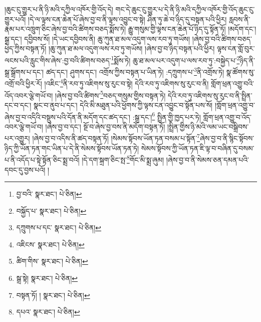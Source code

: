 །ཆུང་ངུ་གྱུར་པ་ནི་ཉི་མའི་དཀྱིལ་འཁོར་གྱི་འོད་དེ། གང་དེ་ཆུང་ངུ་གྱུར་པ་དེ་ནི་ཉི་མའི་དཀྱིལ་འཁོར་གྱི་འོད་ཆུང་ངུ་གྱུར་པའོ། །དེ་ལ་ལྟས་ངན་ཆེན་པོ་ཞེས་བྱ་བ་ནི་ལྟས་འབྱུང་བ་སྟེ། ཤིན་ཏུ་ཆེ་བ་ཉིད་དུ་བསྟན་པའི་ཕྱིར། རླབས་ནི་རྣམ་པར་འཁྲུག་ཅིང་ཞེས་བྱ་བའི་ཚིགས་བཅད་སྨོས་ཏེ། རྒྱུ་གསུམ་གྱི་ལྟས་ངན་ཆེན་པོ་ཉིད་དུ་སྟོན་ཏོ། །མདོག་དང་། སྒྲ་དང་། དབྱིབས་སོ། །དེ་ཡང་དབྱིབས་ནི། ཆུ་ཀུན་ཐ་མལ་འདུག་ལས་རབ་ཏུ་གཡོས། །ཞེས་བྱ་བའི་ཚིགས་བཅད་ཕྱེད་ཀྱིས་བསྟན་ཏོ། །ཆུ་ཀུན་ཐ་མལ་འདུག་ལས་རབ་ཏུ་གཡོས། །ཞེས་བྱ་བ་ཉིད་བསྟན་པའི་ཕྱིར། ལྟས་ངན་གློ་བུར་ལངས་པའི་རླུང་གིས་ཞེས་:བྱ་བའི་ཚིགས་བཅད་\footnote{བྱ་བའི་  སྣར་ཐང་།  པེ་ཅིན། }སྨོས་ཏེ། ཆུ་ཐ་མལ་པར་འདུག་པ་ལས་རབ་ཏུ་:བསྐྱེད་པ་\footnote{བསྐྱོད་པ་  སྣར་ཐང་།  པེ་ཅིན། }ཉིད་ནི་སྒྲ་སྒྲོགས་པ་དང་། ཚད་དང་། ཤུགས་དང་། འགྲོས་ཀྱིས་བསྟན་པ་ཡིན་ཏེ། :དཀྲུགས་པ་\footnote{དཀྲུགས་པ་དང་  སྣར་ཐང་།  པེ་ཅིན། }ནི་འགྲོས་ཏེ། སྣ་ཚོགས་སུ་འགྲོ་བའི་ཕྱིར་རོ། །འཇིང་\footnote{འཇིངས་  སྣར་ཐང་།  པེ་ཅིན། }ནི་རབ་ཏུ་འཇིགས་སུ་རུང་བ་སྟེ། དེའི་རབ་ཏུ་འཇིགས་སུ་རུང་བ་ནི། གློག་ཕྲན་འགྱུ་བའི་འོད་འབར་ལྕེ་གཡོ་བ། །ཞེས་བྱ་བའི་ཚིགས་\footnote{ཚིག་གིས་  སྣར་ཐང་།  པེ་ཅིན། }བཅད་གསུམ་གྱིས་བསྟན་ཏེ། དེའི་རབ་ཏུ་འཇིགས་སུ་རུང་བ་ནི་སྤྲིན་དང་བ་དང་། སྣང་བ་ནུབ་པ་དང་། དེའི་མི་མཐུན་པའི་ཕྱོགས་ཀྱི་ལྟས་ངན་འབྱུང་བ་སྟོན་པས་སོ། །གློག་ཕྲན་འགྱུ་བ་ཞེས་བྱ་བ་འདིའི་བསྡུས་པའི་དོན་ནི་མདོག་དང་ཚད་དང་། :སྒྲ་དང་།\footnote{སྒྲ་སྟེ།  སྣར་ཐང་།  པེ་ཅིན། } སྤྲིན་གྱི་ཁྱད་པར་ཏེ། གློག་ཕྲན་འགྱུ་བ་འོད་འབར་ལྕེ་གཡོ་བ། །ཞེས་བྱ་བ་དང་། སྔོ་བ་ཞེས་བྱ་བས་ནི་མདོག་བསྟན་ཏོ། །སྤྲིན་གྱིས་ཉི་མའི་ལམ་ཡང་བསྒྲིབས་པར་འགྱུར། །ཞེས་བྱ་བ་འདིས་ནི་ཚད་བསྟན་ཏོ། །སེམས་སྟོབས་ཡོན་ཏན་བསམ་པ་སྟོན་\footnote{བསྟན་ཏོ། །  སྣར་ཐང་།  པེ་ཅིན། }ཞེས་བྱ་བ་ནི་སྙིང་སྟོབས་ཉིད་ཀྱི་ཡོན་ཏན་གང་ཡིན་པ་དེ་ནི་སེམས་སྟོབས་ཡོན་ཏན་ཏེ། སེམས་སྟོབས་ཀྱི་ཡོན་ཏན་ཇི་ལྟ་བ་བཞིན་དུ་བསམ་པ་ནི་འདོད་པ་སྟེ་སྟོན་ཅིང་སྨྲ་བའོ། །དེ་དག་སྐྲག་ཅིང་སྤ་\footnote{དཔའ་  སྣར་ཐང་།  པེ་ཅིན། }གོང་མི་སྨྲ་ཞུམ། །ཞེས་བྱ་བ་ནི་སེམས་ཅན་དམན་པའི་དབང་དུ་བྱས་པའོ། །
